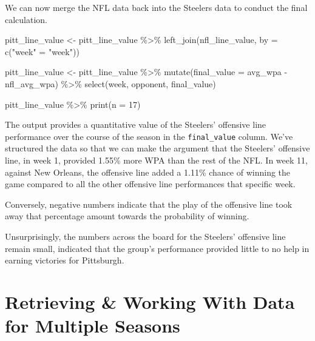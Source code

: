 \documentclass[
  letterpaper,
]{krantz}
\newenvironment{Shaded}{\begin{snugshade}}{\end{snugshade}}
\newcommand{\AttributeTok}[1]{\textcolor[rgb]{0.40,0.45,0.13}{#1}}
\newcommand{\DecValTok}[1]{\textcolor[rgb]{0.68,0.00,0.00}{#1}}
\newcommand{\FunctionTok}[1]{\textcolor[rgb]{0.28,0.35,0.67}{#1}}
\newcommand{\NormalTok}[1]{\textcolor[rgb]{0.00,0.23,0.31}{#1}}
\newcommand{\OtherTok}[1]{\textcolor[rgb]{0.00,0.23,0.31}{#1}}
\newcommand{\SpecialCharTok}[1]{\textcolor[rgb]{0.37,0.37,0.37}{#1}}
\newcommand{\StringTok}[1]{\textcolor[rgb]{0.13,0.47,0.30}{#1}}
\begin{document}
We can now merge the NFL data back into the Steelers data to conduct the
final calculation.

\begin{Shaded}
\begin{Highlighting}[]
\NormalTok{pitt\_line\_value }\OtherTok{\textless{}{-}}\NormalTok{ pitt\_line\_value }\SpecialCharTok{\%\textgreater{}\%}
  \FunctionTok{left\_join}\NormalTok{(nfl\_line\_value, }\AttributeTok{by =} \FunctionTok{c}\NormalTok{(}\StringTok{"week"} \OtherTok{=} \StringTok{"week"}\NormalTok{))}

\NormalTok{pitt\_line\_value }\OtherTok{\textless{}{-}}\NormalTok{ pitt\_line\_value }\SpecialCharTok{\%\textgreater{}\%}
  \FunctionTok{mutate}\NormalTok{(}\AttributeTok{final\_value =}\NormalTok{ avg\_wpa }\SpecialCharTok{{-}}\NormalTok{ nfl\_avg\_wpa) }\SpecialCharTok{\%\textgreater{}\%}
  \FunctionTok{select}\NormalTok{(week, opponent, final\_value)}

\NormalTok{pitt\_line\_value }\SpecialCharTok{\%\textgreater{}\%}
  \FunctionTok{print}\NormalTok{(}\AttributeTok{n =} \DecValTok{17}\NormalTok{)}
\end{Highlighting}
\end{Shaded}

The output provides a quantitative value of the Steelers' offensive line
performance over the course of the season in the \texttt{final\_value}
column. We've structured the data so that we can make the argument that
the Steelers' offensive line, in week 1, provided 1.55\% more WPA than
the rest of the NFL. In week 11, against New Orleans, the offensive line
added a 1.11\% chance of winning the game compared to all the other
offensive line performances that specific week.

Conversely, negative numbers indicate that the play of the offensive
line took away that percentage amount towards the probability of
winning.

Unsurprisingly, the numbers across the board for the Steelers' offensive
line remain small, indicated that the group's performance provided
little to no help in earning victories for Pittsburgh.

\hypertarget{retrieving-working-with-data-for-multiple-seasons}{%
\section{Retrieving \& Working With Data for Multiple
Seasons}\label{retrieving-working-with-data-for-multiple-seasons}}
\end{document}
